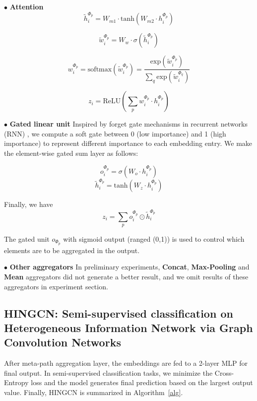 $\bullet$ \textbf{Attention}
\begin{equation}
\label{eq:mp_mlp}
\tilde{h}^{\Phi_p}_i = W_{m1} \cdot \text{tanh}(W_{m2} \cdot h^{\Phi_p}_i)
\end{equation}

\begin{equation}
\label{eq:mp_attn}
\tilde{w}_i^{\Phi_p} = W_w \cdot \sigma(\tilde{h}^{\Phi_p}_i)
\end{equation}

\begin{equation}
\label{eq:mp_soft}
w_i^{\Phi_p} = \text{softmax}(\tilde{w}_i^{\Phi_p}) = \dfrac{\text{exp}(\tilde{w}_i^{\Phi_p})}{\sum_q \text{exp}(\tilde{w}_i^{\Phi_q})}
\end{equation}

\begin{equation}
\label{eq:mp_asum}
z_i = \text{ReLU}(\sum_p w_i^{\Phi_p} \cdot h^{\Phi_p}_i)
\end{equation}

$\bullet$ \textbf{Gated linear unit}
Inspired by forget gate mechanisms in recurrent networks (RNN) , we compute a soft gate between 0 (low importance) and 1 (high importance) to represent different importance to each embedding entry.
We make the element-wise gated sum layer as follows:
\begin{multicols}{2}
\begin{equation}
o^{\Phi_p}_i=\sigma(W_o \cdot h^{\Phi_p}_i)
\end{equation}\break
\begin{equation}
\tilde{h}^{\Phi_p}_i=\text{tanh}(W_z \cdot h^{\Phi_p}_i)
\end{equation}
\end{multicols}
Finally, we have
\begin{equation}
\label{eq:mp_sum}
{z}_i= \sum_p o^{\Phi_p}_i\odot \tilde{h}^{\Phi_p}_i
\end{equation}

The gated unit $o_{\Phi_p}$ with sigmoid output (ranged (0,1)) is used to control which elements are to be aggregated in the output. 
 
$\bullet$ \textbf{Other aggregators}
In preliminary experiments, \textbf{Concat}, \textbf{Max-Pooling} and \textbf{Mean} aggregators did not generate a better result, and we omit results of these aggregators in experiment section.

\subsection{HINGCN: Semi-supervised classification on Heterogeneous Information Network via Graph Convolution Networks}
After meta-path aggregation layer, the embeddings are fed to a 2-layer MLP for final output. In semi-supervised classification tasks, we minimize the Cross-Entropy loss and the model generates final prediction based on the largest output value.
Finally, HINGCN is summarized in Algorithm~\ref{alg}.

